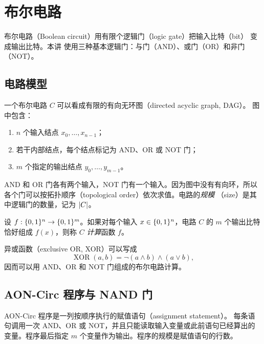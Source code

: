 \chapter{布尔电路}
\label{chap:boolean-circuits}
\lecture
\label{lec:boolean-circuits-basics}

布尔电路（Boolean circuit）用有限个逻辑门（logic gate）把输入比特（bit）
变成输出比特。本讲
使用三种基本逻辑门：与门（AND）、或门（OR）和非门（NOT）。

\section{电路模型}

一个布尔电路 $C$ 可以看成有限的有向无环图（directed acyclic graph, DAG）。
图中包含：

\begin{enumerate}[label=\arabic*.]
  \item $n$ 个输入结点 $x_0,\ldots,x_{n-1}$；
  \item 若干内部结点，每个结点标记为 AND、OR 或 NOT 门；
  \item $m$ 个指定的输出结点 $y_0,\ldots,y_{m-1}$。
\end{enumerate}

AND 和 OR 门各有两个输入，NOT 门有一个输入。因为图中没有有向环，所以
各个门可以按拓扑顺序（topological order）依次求值。电路的\emph{规模}
（size）是其中逻辑门的数量，记为 $\lvert C\rvert$。

\begin{definition}[电路计算]
  \label{def:circuit-computes}
  设 $f:\{0,1\}^n\to\{0,1\}^m$。如果对每个输入
  $x\in\{0,1\}^n$，电路 $C$ 的 $m$ 个输出比特恰好组成 $f(x)$，则称
  $C$ \emph{计算}函数 $f$。
\end{definition}

\begin{example}
  \label{ex:xor-circuit}
  异或函数（exclusive OR, XOR）可以写成
  \[
    \operatorname{XOR}(a,b)
    =\neg(a\land b)\land(a\lor b),
  \]
  因而可以用 AND、OR 和 NOT 门组成的布尔电路计算。
\end{example}

\section{AON-Circ 程序与 NAND 门}

\begin{definition}
  \label{def:aon-circ-program}
  AON-Circ 程序是一列按顺序执行的赋值语句（assignment statement）。
  每条语句调用一次 AND、OR
  或 NOT，并且只能读取输入变量或此前语句已经算出的变量。程序最后指定
  $m$ 个变量作为输出。程序的规模是赋值语句的行数。
\end{definition}

